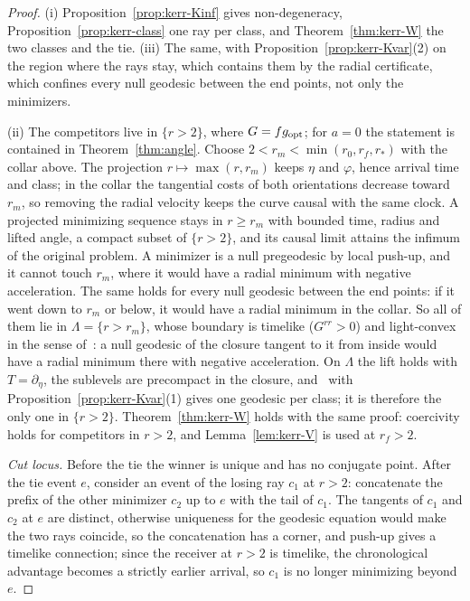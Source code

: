 \documentclass[aip,jmp,amsmath,amssymb,reprint]{revtex4-2}
\newcommand{\gopt}{g_{\rm opt}}
\theoremstyle{plain}
\theoremstyle{definition}
\begin{document}
\begin{proof}
(i) Proposition~\ref{prop:kerr-Kinf} gives non-degeneracy, Proposition~\ref{prop:kerr-class} one ray per
class, and Theorem~\ref{thm:kerr-W} the two classes and the tie. (iii) The same, with
Proposition~\ref{prop:kerr-Kvar}(2) on the region where the rays stay, which contains them by the
radial certificate, which confines every null geodesic between the end points, not only the
minimizers.

(ii) The competitors live in $\{r>2\}$, where $G=f\gopt$; for $a=0$ the statement is contained in
Theorem~\ref{thm:angle}. Choose $2<r_m<\min(r_0,r_f,r_*)$ with the collar above. The projection
$r\mapsto\max(r,r_m)$ keeps $\eta$ and $\varphi$, hence arrival time and class; in the collar the tangential
costs of both orientations decrease toward $r_m$, so removing the radial velocity keeps the
curve causal with the same clock. A projected minimizing sequence stays in $r\ge r_m$ with bounded
time, radius and lifted angle, a compact subset of $\{r>2\}$, and its causal limit attains the
infimum of the original problem. A minimizer is a null pregeodesic by local push-up, and it
cannot touch $r_m$, where it would have a radial minimum with negative acceleration. The same
holds for every null geodesic between the end points: if it went down to $r_m$ or below, it
would have a radial minimum in the collar. So all of them lie in $\Lambda=\{r>r_m\}$, whose boundary is timelike ($G^{rr}>0$) and light-convex in the sense
of~\cite{GiannoniMasielloPiccioneMorse}: a null geodesic of the closure tangent to it from inside would have a radial
minimum there with negative acceleration. On $\Lambda$ the lift holds with $T=\partial_\eta$, the sublevels are
precompact in the closure, and~\cite[Theorem~1.7]{GiannoniMasielloPiccioneMorse} with
Proposition~\ref{prop:kerr-Kvar}(1) gives one geodesic per class; it is therefore the only one in
$\{r>2\}$. Theorem~\ref{thm:kerr-W} holds with the same proof: coercivity holds for competitors in
$r>2$, and Lemma~\ref{lem:kerr-V} is used at $r_f>2$.

\emph{Cut locus.} Before the tie the winner is unique and has no conjugate point. After the tie
event $e$, consider an event of the losing ray $c_1$ at $r>2$: concatenate the prefix of the other
minimizer $c_2$ up to $e$ with the tail of $c_1$. The tangents of $c_1$ and $c_2$ at $e$ are distinct,
otherwise uniqueness for the geodesic equation would make the two rays coincide, so the
concatenation has a corner, and push-up gives a timelike connection; since the receiver at $r>2$ is
timelike, the chronological advantage becomes a strictly earlier arrival, so $c_1$ is no longer
minimizing beyond $e$.
\end{proof}
\end{document}
